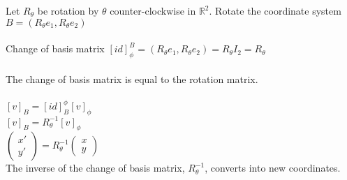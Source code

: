 \documentclass[letterpaper,12pt]{article}
\begin{document}
\begin{example}
Let $R_{\theta}$ be rotation by $\theta$ counter-clockwise in $\mathbb{R}^2$. Rotate the coordinate system $B = (R_{\theta}e_1, R_{\theta}e_2)$
\\ \\ Change of basis matrix $[id]_{\phi}^B = (R_{\theta}e_1, R_{\theta}e_2) = R_{\theta}I_2 = R_{\theta}$
\\ \\ The change of basis matrix is equal to the rotation matrix.
\\ \\ $[v]_B = [id]_B^{\phi} [v]_{\phi}$
\\ $[v]_B = R_{\theta}^{-1} [v]_{\phi}$
\\ $\begin{pmatrix} x' \\ y' \end{pmatrix} = R_{\theta}^{-1} \begin{pmatrix} x \\ y \end{pmatrix}$
\\ The inverse of the change of basis matrix, $R_{\theta}^{-1}$, converts into new coordinates.
\end{example}
\end{document}

